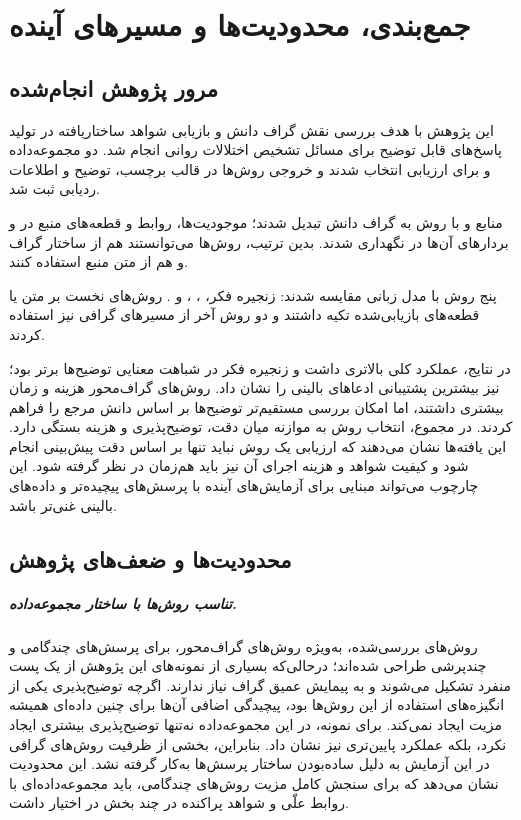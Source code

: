 \chapter{جمع‌بندی، محدودیت‌ها و مسیرهای آینده}

\section{مرور پژوهش انجام‌شده}
این پژوهش با هدف بررسی نقش گراف دانش و بازیابی شواهد ساختاریافته در تولید پاسخ‌های قابل توضیح برای مسائل تشخیص اختلالات روانی انجام شد. دو مجموعه‌داده  و  برای ارزیابی انتخاب شدند و خروجی روش‌ها در قالب برچسب، توضیح و اطلاعات ردیابی ثبت شد.

منابع  و  با روش  به گراف دانش تبدیل شدند؛ موجودیت‌ها، روابط و قطعه‌های منبع در  و بردارهای آن‌ها در  نگهداری شدند. بدین ترتیب، روش‌ها می‌توانستند هم از ساختار گراف و هم از متن منبع استفاده کنند.

پنج روش با مدل زبانی  مقایسه شدند: زنجیره فکر، ، ،  و . روش‌های نخست بر متن یا قطعه‌های بازیابی‌شده تکیه داشتند و دو روش آخر از مسیرهای گرافی نیز استفاده کردند.

در نتایج،  عملکرد کلی بالاتری داشت و زنجیره فکر در شباهت معنایی توضیح‌ها برتر بود؛  نیز بیشترین پشتیبانی ادعاهای بالینی را نشان داد. روش‌های گراف‌محور هزینه و زمان بیشتری داشتند، اما امکان بررسی مستقیم‌تر توضیح‌ها بر اساس دانش مرجع را فراهم کردند. در مجموع، انتخاب روش به موازنه میان دقت، توضیح‌پذیری و هزینه بستگی دارد.
این یافته‌ها نشان می‌دهند که ارزیابی یک روش نباید تنها بر اساس دقت پیش‌بینی انجام شود و کیفیت شواهد و هزینه اجرای آن نیز باید هم‌زمان در نظر گرفته شود.
این چارچوب می‌تواند مبنایی برای آزمایش‌های آینده با پرسش‌های پیچیده‌تر و داده‌های بالینی غنی‌تر باشد.

\section{محدودیت‌ها و ضعف‌های پژوهش}

\paragraph{تناسب روش‌ها با ساختار مجموعه‌داده.}
روش‌های بررسی‌شده، به‌ویژه روش‌های گراف‌محور، برای پرسش‌های چندگامی و چندپرشی طراحی شده‌اند؛ درحالی‌که بسیاری از نمونه‌های این پژوهش از یک پست منفرد تشکیل می‌شوند و به پیمایش عمیق گراف نیاز ندارند. اگرچه توضیح‌پذیری یکی از انگیزه‌های استفاده از این روش‌ها بود، پیچیدگی اضافی آن‌ها برای چنین داده‌ای همیشه مزیت ایجاد نمی‌کند. برای نمونه،  در این مجموعه‌داده نه‌تنها توضیح‌پذیری بیشتری ایجاد نکرد، بلکه عملکرد پایین‌تری نیز نشان داد. بنابراین، بخشی از ظرفیت روش‌های گرافی در این آزمایش به دلیل ساده‌بودن ساختار پرسش‌ها به‌کار گرفته نشد.
این محدودیت نشان می‌دهد که برای سنجش کامل مزیت روش‌های چندگامی، باید مجموعه‌داده‌ای با روابط علّی و شواهد پراکنده در چند بخش در اختیار داشت.

